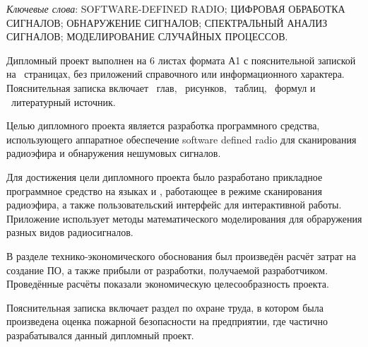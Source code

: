 \thispagestyle{empty}

\emph{Ключевые слова}: \MakeUppercase{software-defined radio; цифровая обработка сигналов; обнаружение сигналов; спектральный анализ сигналов; моделирование случайных процессов}.

\vspace{4\parsep}

Дипломный проект выполнен на 6 листах формата А1 с пояснительной запиской на~\pageref*{LastPage} страницах, без приложений справочного или информационного характера. 
Пояснительная записка включает ~глав, \totfig{}~рисунков, \tottab{}~таблиц, \toteq{}~формул и \totref{}~литературный источник.

Целью дипломного проекта является разработка программного средства, использующего аппаратное обеспечение software defined radio для сканирования радиоэфира и обнаружения нешумовых сигналов.

Для достижения цели дипломного проекта было разработано прикладное программное средство на языках \python{} и \purec{}, работающее в режиме сканирования радиоэфира, а также пользовательский интерфейс для интерактивной работы.
Приложение использует методы математического моделирования для обраружения разных видов радиосигналов.

В разделе технико-экономического обоснования был произведён расчёт затрат на создание ПО, а также прибыли от разработки, получаемой разработчиком.
Проведённые расчёты показали экономическую целесообразность проекта.

Пояснительная записка включает раздел по охране труда, в котором была произведена оценка пожарной безопасности на предприятии, где частично разрабатывался данный дипломный проект.

\clearpage
